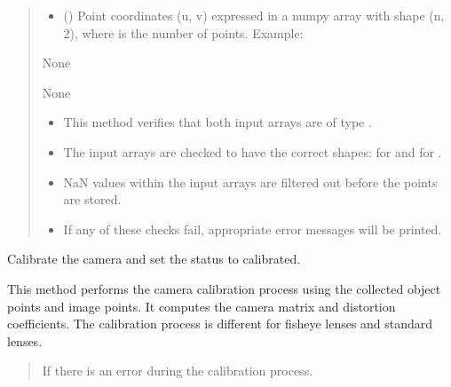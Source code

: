 \documentclass[letterpaper,10pt,english]{sphinxmanual}
\begin{document}
\begin{fulllineitems}
\begin{fulllineitems}
\begin{quote}
\begin{description}
\begin{itemize}
\item {} 
\sphinxAtStartPar
{} () \textendash{} Point coordinates (u, v) expressed in a numpy array with shape (n, 2),
where  is the number of points. Example: \sphinxtitleref{{[}{[}u, v{]}, …{]}}

\end{itemize}

\sphinxAtStartPar
None

\sphinxAtStartPar
None

\begin{itemize}
\item {} 
\sphinxAtStartPar
This method verifies that both input arrays are of type .

\item {} 
\sphinxAtStartPar
The input arrays are checked to have the correct shapes:  for  and  for .

\item {} 
\sphinxAtStartPar
NaN values within the input arrays are filtered out before the points are stored.

\item {} 
\sphinxAtStartPar
If any of these checks fail, appropriate error messages will be printed.

\end{itemize}

\end{description}\end{quote}

\end{fulllineitems}


\begin{fulllineitems}
\label{\detokenize{CameraUtils:id5}}
\pysigstartsignatures
{}
\pysigstopsignatures
\sphinxAtStartPar
Calibrate the camera and set the status to calibrated.

\sphinxAtStartPar
This method performs the camera calibration process using the collected
object points and image points. It computes the camera matrix and
distortion coefficients. The calibration process is different for
fisheye lenses and standard lenses.
\begin{quote}\begin{description}
\sphinxAtStartPar
{} \textendash{} If there is an error during the calibration process.


\end{description}
\end{quote}
\end{fulllineitems}
\end{fulllineitems}
\end{document}
